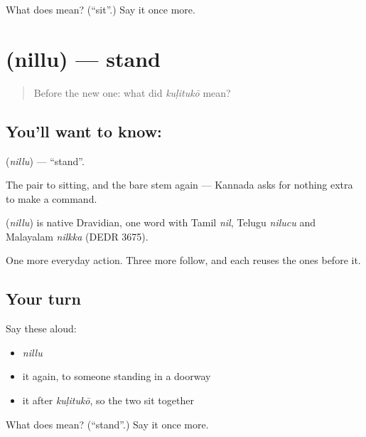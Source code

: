 \begin{tcolorbox}[breakable,colback=teal!4,colframe=teal!35!black,title={Before you move on}]
What does  mean? (\textquotedblleft{}sit\textquotedblright{}.) Say it once more.
\end{tcolorbox}
\section[\texorpdfstring{\kn{ನಿಲ್ಲು} (nillu)}{ನಿಲ್ಲು (nillu)}]{ (nillu) — stand}

\label{lesson:KA-C43-stand}



\begin{quote}
Before the new one: what did \emph{kuḷitukō} mean?
\end{quote}

\subsection*{You'll want to know: }
\textbf{} (\emph{nillu}) — \textquotedblleft{}stand\textquotedblright{}.

The pair to sitting, and the bare stem again — Kannada asks for nothing extra to make a command.

\begin{cousinweb}
\textbf{} (\emph{nillu}) is native Dravidian, one word with Tamil \emph{nil}, Telugu \emph{nilucu} and Malayalam \emph{nilkka} (DEDR 3675).
\end{cousinweb}

\begin{grammarlens}[title={What you've built}]
One more everyday action. Three more follow, and each reuses the ones before it.
\end{grammarlens}

\subsection*{Your turn}
Say these aloud:

\begin{itemize}
\raggedright
  \item \emph{nillu}
  \item it again, to someone standing in a doorway
  \item it after \emph{kuḷitukō}, so the two sit together
\end{itemize}

\begin{tcolorbox}[breakable,colback=teal!4,colframe=teal!35!black,title={Before you move on}]
What does  mean? (\textquotedblleft{}stand\textquotedblright{}.) Say it once more.
\end{tcolorbox}
